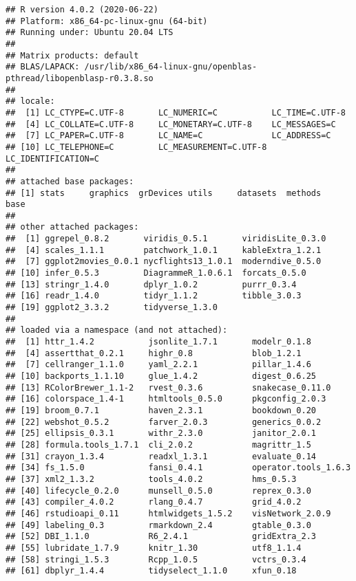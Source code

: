\documentclass[
]{book}
\begin{document}
\begin{verbatim}
## R version 4.0.2 (2020-06-22)
## Platform: x86_64-pc-linux-gnu (64-bit)
## Running under: Ubuntu 20.04 LTS
## 
## Matrix products: default
## BLAS/LAPACK: /usr/lib/x86_64-linux-gnu/openblas-pthread/libopenblasp-r0.3.8.so
## 
## locale:
##  [1] LC_CTYPE=C.UTF-8       LC_NUMERIC=C           LC_TIME=C.UTF-8       
##  [4] LC_COLLATE=C.UTF-8     LC_MONETARY=C.UTF-8    LC_MESSAGES=C         
##  [7] LC_PAPER=C.UTF-8       LC_NAME=C              LC_ADDRESS=C          
## [10] LC_TELEPHONE=C         LC_MEASUREMENT=C.UTF-8 LC_IDENTIFICATION=C   
## 
## attached base packages:
## [1] stats     graphics  grDevices utils     datasets  methods   base     
## 
## other attached packages:
##  [1] ggrepel_0.8.2       viridis_0.5.1       viridisLite_0.3.0  
##  [4] scales_1.1.1        patchwork_1.0.1     kableExtra_1.2.1   
##  [7] ggplot2movies_0.0.1 nycflights13_1.0.1  moderndive_0.5.0   
## [10] infer_0.5.3         DiagrammeR_1.0.6.1  forcats_0.5.0      
## [13] stringr_1.4.0       dplyr_1.0.2         purrr_0.3.4        
## [16] readr_1.4.0         tidyr_1.1.2         tibble_3.0.3       
## [19] ggplot2_3.3.2       tidyverse_1.3.0    
## 
## loaded via a namespace (and not attached):
##  [1] httr_1.4.2           jsonlite_1.7.1       modelr_0.1.8        
##  [4] assertthat_0.2.1     highr_0.8            blob_1.2.1          
##  [7] cellranger_1.1.0     yaml_2.2.1           pillar_1.4.6        
## [10] backports_1.1.10     glue_1.4.2           digest_0.6.25       
## [13] RColorBrewer_1.1-2   rvest_0.3.6          snakecase_0.11.0    
## [16] colorspace_1.4-1     htmltools_0.5.0      pkgconfig_2.0.3     
## [19] broom_0.7.1          haven_2.3.1          bookdown_0.20       
## [22] webshot_0.5.2        farver_2.0.3         generics_0.0.2      
## [25] ellipsis_0.3.1       withr_2.3.0          janitor_2.0.1       
## [28] formula.tools_1.7.1  cli_2.0.2            magrittr_1.5        
## [31] crayon_1.3.4         readxl_1.3.1         evaluate_0.14       
## [34] fs_1.5.0             fansi_0.4.1          operator.tools_1.6.3
## [37] xml2_1.3.2           tools_4.0.2          hms_0.5.3           
## [40] lifecycle_0.2.0      munsell_0.5.0        reprex_0.3.0        
## [43] compiler_4.0.2       rlang_0.4.7          grid_4.0.2          
## [46] rstudioapi_0.11      htmlwidgets_1.5.2    visNetwork_2.0.9    
## [49] labeling_0.3         rmarkdown_2.4        gtable_0.3.0        
## [52] DBI_1.1.0            R6_2.4.1             gridExtra_2.3       
## [55] lubridate_1.7.9      knitr_1.30           utf8_1.1.4          
## [58] stringi_1.5.3        Rcpp_1.0.5           vctrs_0.3.4         
## [61] dbplyr_1.4.4         tidyselect_1.1.0     xfun_0.18
\end{verbatim}
\end{document}
